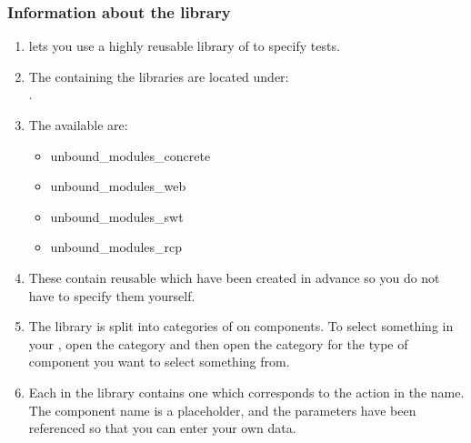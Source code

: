 \subsubsection{Information about the library}
\label{LibraryInformation}
\begin{enumerate}
\item \app{} lets you use a  highly reusable library of \gdcases{} to specify tests. 
\item The \gdprojects{} containing the \gdcase{} libraries are located under:\\
.

\item The \gdprojects{} available are:
\begin{itemize}
\item unbound\_modules\_concrete
\item unbound\_modules\_web
\item unbound\_modules\_swt
\item unbound\_modules\_rcp
\end{itemize}

\item These \gdprojects{} contain reusable \gdcases{} which have been created in advance so you do not have to specify them yourself.
\item The library is split into categories of  on components. To select something in your \gdaut{}, open the  category and then open the category for the type of component you want to select something from. 

\item Each \gdcase{} in the library contains one \gdstep{} which corresponds to the action in the \gdcase{} name. The component name is a placeholder, and the parameters have been referenced so that you can enter your own data. 

 



\end{enumerate}

